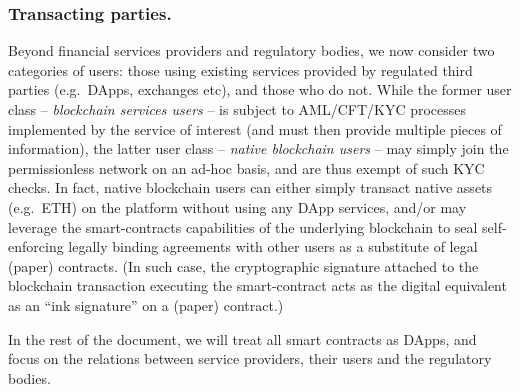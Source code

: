 \documentclass[runningheads,10pt]{llncs}
\numberwithin{equation}{section}
\begin{document}
\subsubsection{Transacting parties.}
Beyond financial services providers and regulatory bodies, we now consider two
categories of users: those using existing services provided by regulated third
parties (e.g.~DApps, exchanges etc), and those who do not.  While the former
user class -- \emph{blockchain services users} -- is subject to AML/CFT/KYC
processes implemented by the service of interest (and must then provide multiple
pieces of information), the latter user class -- \emph{native blockchain users}
-- may simply join the permissionless network on an ad-hoc basis, and are thus
exempt of such KYC checks.  In fact, native blockchain users can either simply
transact native assets (e.g.~ETH) on the platform without using any DApp
services, and/or may leverage the smart-contracts capabilities of the underlying
blockchain to seal self-enforcing legally binding agreements with other users as
a substitute of legal (paper) contracts. (In such case, the cryptographic
signature attached to the blockchain transaction executing the smart-contract
acts as the digital equivalent as an ``ink signature'' on a (paper) contract.)

In the rest of the document, we will treat all smart contracts as DApps, and
focus on the relations between service providers, their users and the
regulatory bodies.


\end{document}
